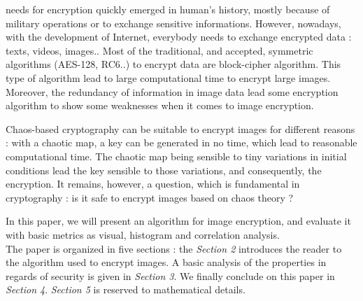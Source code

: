  needs for encryption quickly emerged in human's history, mostly because of military operations or to exchange sensitive informations. However, nowadays, with the development of Internet, everybody needs to exchange encrypted data : texts, videos, images.. 
Most of the traditional, and accepted, symmetric algorithms (AES-128, RC6..) to encrypt data are block-cipher algorithm. This type of algorithm lead to large computational time to encrypt large images. Moreover, the redundancy of information in image data lead some encryption algorithm to show some weaknesses when it comes to image encryption.  

Chaos-based cryptography can be suitable to encrypt images for different reasons : with a chaotic map, a key can be generated in no time, which lead to reasonable computational time. The chaotic map being sensible to tiny variations in initial conditions lead the key sensible to those variations, and consequently, the encryption. It remains, however, a question, which is fundamental in cryptography : is it safe to encrypt images based on chaos theory ? 

In this paper, we will present an algorithm for image encryption, and evaluate it with basic metrics as visual, histogram and correlation analysis. \\
The paper is organized in five sections : the \textit{Section 2} introduces the reader to the algorithm used to encrypt images. A basic analysis of the properties in regards of security is given in \textit{Section 3}. We finally conclude on this paper in \textit{Section 4}. \textit{Section 5} is reserved to mathematical details.


